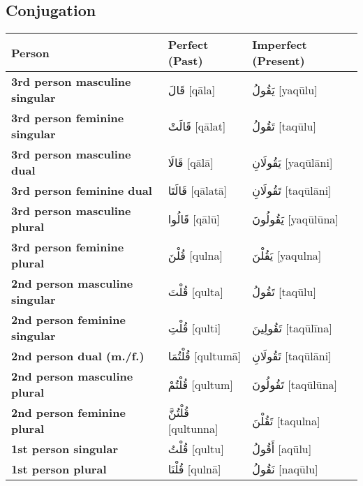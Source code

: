 \documentclass[letter,12pt]{article}
\begin{document}
\subsection{Conjugation}
\begin{longtable}{|>{\raggedright}p{3.5cm}|p{5cm}|p{5cm}|}
\hline
\textbf{Person} & \textbf{Perfect (Past)} & \textbf{Imperfect (Present)} \\
\hline
\textbf{3rd person masculine singular} & \textarabic{قَالَ} [qāla] & \textarabic{يَقُولُ} [yaqūlu] \\
\hline
\textbf{3rd person feminine singular} & \textarabic{قَالَتْ} [qālat] & \textarabic{تَقُولُ} [taqūlu] \\
\hline
\textbf{3rd person masculine dual} & \textarabic{قَالَا} [qālā] & \textarabic{يَقُولَانِ} [yaqūlāni] \\
\hline
\textbf{3rd person feminine dual} & \textarabic{قَالَتَا} [qālatā] & \textarabic{تَقُولَانِ} [taqūlāni] \\
\hline
\textbf{3rd person masculine plural} & \textarabic{قَالُوا} [qālū] & \textarabic{يَقُولُونَ} [yaqūlūna] \\
\hline
\textbf{3rd person feminine plural} & \textarabic{قُلْنَ} [qulna] & \textarabic{يَقُلْنَ} [yaqulna] \\
\hline
\textbf{2nd person masculine singular} & \textarabic{قُلْتَ} [qulta] & \textarabic{تَقُولُ} [taqūlu] \\
\hline
\textbf{2nd person feminine singular} & \textarabic{قُلْتِ} [qulti] & \textarabic{تَقُولِينَ} [taqūlīna] \\
\hline
\textbf{2nd person dual (m./f.)} & \textarabic{قُلْتُمَا} [qultumā] & \textarabic{تَقُولَانِ} [taqūlāni] \\
\hline
\textbf{2nd person masculine plural} & \textarabic{قُلْتُمْ} [qultum] & \textarabic{تَقُولُونَ} [taqūlūna] \\
\hline
\textbf{2nd person feminine plural} & \textarabic{قُلْتُنَّ} [qultunna] & \textarabic{تَقُلْنَ} [taqulna] \\
\hline
\textbf{1st person singular} & \textarabic{قُلْتُ} [qultu] & \textarabic{أَقُولُ} [aqūlu] \\
\hline
\textbf{1st person plural} & \textarabic{قُلْنَا} [qulnā] & \textarabic{نَقُولُ} [naqūlu] \\
\hline
\end{longtable}
\end{document}
